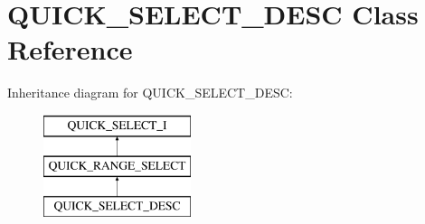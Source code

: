 \hypertarget{classQUICK__SELECT__DESC}{}\section{Q\+U\+I\+C\+K\+\_\+\+S\+E\+L\+E\+C\+T\+\_\+\+D\+E\+SC Class Reference}
\label{classQUICK__SELECT__DESC}
Inheritance diagram for Q\+U\+I\+C\+K\+\_\+\+S\+E\+L\+E\+C\+T\+\_\+\+D\+E\+SC\+:\begin{figure}[H]
\begin{center}
\leavevmode
\includegraphics[height=3.000000cm]{classQUICK__SELECT__DESC}
\end{center}
\end{figure}
